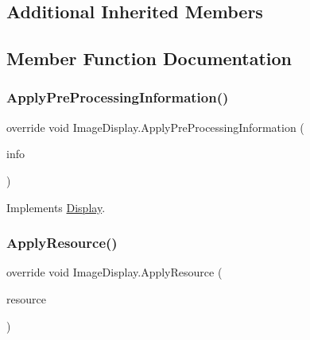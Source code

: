 \subsection*{Additional Inherited Members}


\subsection{Member Function Documentation}
\mbox{\label{class_image_display_a0ad82d85f6c4ec5eabb65afa1ae72bc1}} 
\subsubsection{\texorpdfstring{Apply\+Pre\+Processing\+Information()}{ApplyPreProcessingInformation()}}
{\footnotesize\ttfamily override void Image\+Display.\+Apply\+Pre\+Processing\+Information (\begin{DoxyParamCaption}\item[{\mbox{\hyperlink{class_pre_processing_game_object_information}{Pre\+Processing\+Game\+Object\+Information}}}]{info }\end{DoxyParamCaption})\hspace{0.3cm}{\ttfamily [virtual]}}



Implements \mbox{\hyperlink{class_display_ab9cd24c11c43dd87bc50e85a8e9e4c31}{Display}}.

\mbox{\label{class_image_display_ab4cae8c66db7e7d77ab117fe24e63980}} 
\subsubsection{\texorpdfstring{Apply\+Resource()}{ApplyResource()}}
{\footnotesize\ttfamily override void Image\+Display.\+Apply\+Resource (\begin{DoxyParamCaption}\item[{\mbox{\hyperlink{class_base_display_resource}{Base\+Display\+Resource}}}]{resource }\end{DoxyParamCaption})\hspace{0.3cm}{\ttfamily [virtual]}}



